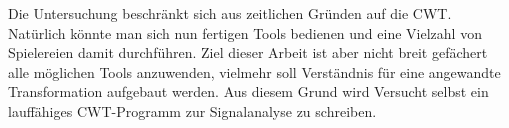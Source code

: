 Die Untersuchung beschränkt sich aus zeitlichen Gründen auf die CWT. Natürlich könnte man sich nun fertigen Tools bedienen und eine Vielzahl von Spielereien damit durchführen. Ziel dieser Arbeit ist aber nicht breit gefächert alle möglichen Tools anzuwenden, vielmehr soll Verständnis für eine angewandte Transformation aufgebaut werden. Aus diesem Grund wird Versucht selbst ein lauffähiges CWT-Programm zur Signalanalyse zu schreiben. 